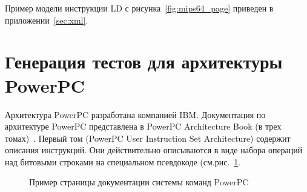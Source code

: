 Пример модели инструкции LD с рисунка~\ref{fig:mips64_page} приведен в приложении~\ref{sec:xml}.

\section{Генерация тестов для архитектуры PowerPC}\label{sec:ppc_application}

Архитектура PowerPC разработана компанией IBM. Документация по архитектуре
PowerPC представлена в PowerPC Architecture Book (в трех томах)~\cite{PowerPC}. Первый том (PowerPC User Instruction Set Architecture) содержит описания инструкций. Они действительно описываются в виде набора операций над битовыми строками на специальном псевдокоде (см.рис.~\ref{fig:ppc_page}.

\begin{figure}
\caption{Пример страницы документации системы команд PowerPC}\label{fig:ppc_page}
\end{figure}

